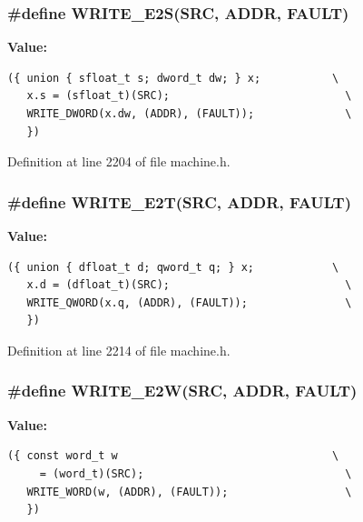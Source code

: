 \subsubsection[{WRITE\_\-E2S}]{\setlength{\rightskip}{0pt plus 5cm}\#define WRITE\_\-E2S(SRC, \/  ADDR, \/  FAULT)}\label{machine_8h_0ddfb39e7612fb3650463fbb2c5fd57b}


\textbf{Value:}

\begin{Code}\begin{verbatim}({ union { sfloat_t s; dword_t dw; } x;           \
   x.s = (sfloat_t)(SRC);                           \
   WRITE_DWORD(x.dw, (ADDR), (FAULT));              \
   })
\end{verbatim}
\end{Code}


Definition at line 2204 of file machine.h.
\subsubsection[{WRITE\_\-E2T}]{\setlength{\rightskip}{0pt plus 5cm}\#define WRITE\_\-E2T(SRC, \/  ADDR, \/  FAULT)}\label{machine_8h_16126eb3db83100d2356b52f0369a598}


\textbf{Value:}

\begin{Code}\begin{verbatim}({ union { dfloat_t d; qword_t q; } x;            \
   x.d = (dfloat_t)(SRC);                           \
   WRITE_QWORD(x.q, (ADDR), (FAULT));               \
   })
\end{verbatim}
\end{Code}


Definition at line 2214 of file machine.h.
\subsubsection[{WRITE\_\-E2W}]{\setlength{\rightskip}{0pt plus 5cm}\#define WRITE\_\-E2W(SRC, \/  ADDR, \/  FAULT)}\label{machine_8h_df420f0a98f9fdac910ed9fe81ee9cff}


\textbf{Value:}

\begin{Code}\begin{verbatim}({ const word_t w                                 \
     = (word_t)(SRC);                               \
   WRITE_WORD(w, (ADDR), (FAULT));                  \
   })
\end{verbatim}
\end{Code}


